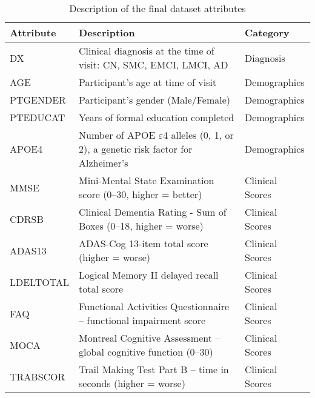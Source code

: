 \begin{table}[H]
	\small
	\centering
	\caption{Description of the final dataset attributes}
	\label{tab:dataset-attributes}
	\begin{adjustbox}{max width=\textwidth}
		\begin{tabularx}{\textwidth}{>{\raggedright\arraybackslash}p{3cm} >{\raggedright\arraybackslash}X >{\raggedright\arraybackslash}p{3cm}}
			\toprule
			\textbf{Attribute} & \textbf{Description} & \textbf{Category} \\
			\midrule
			DX                    & Clinical diagnosis at the time of visit: CN, SMC, EMCI, LMCI, AD                   & Diagnosis             \\
			AGE                   & Participant’s age at time of visit                                                 & Demographics          \\
			PTGENDER              & Participant's gender (Male/Female)                                                 & Demographics          \\
			PTEDUCAT              & Years of formal education completed                                                & Demographics          \\
			APOE4                 & Number of APOE $\varepsilon$4 alleles (0, 1, or 2), a genetic risk factor for Alzheimer’s      & Demographics          \\
			MMSE                  & Mini-Mental State Examination score (0–30, higher = better)                        & Clinical Scores       \\
			CDRSB                 & Clinical Dementia Rating - Sum of Boxes (0–18, higher = worse)                     & Clinical Scores       \\
			ADAS13                & ADAS-Cog 13-item total score (higher = worse)                                      & Clinical Scores       \\
			LDELTOTAL             & Logical Memory II delayed recall total score                                       & Clinical Scores       \\
			FAQ                   & Functional Activities Questionnaire – functional impairment score                  & Clinical Scores       \\
			MOCA                  & Montreal Cognitive Assessment – global cognitive function (0–30)                   & Clinical Scores       \\
			TRABSCOR              & Trail Making Test Part B – time in seconds (higher = worse)                        & Clinical Scores       \\

\end{tabularx}
\end{adjustbox}
\end{table}

